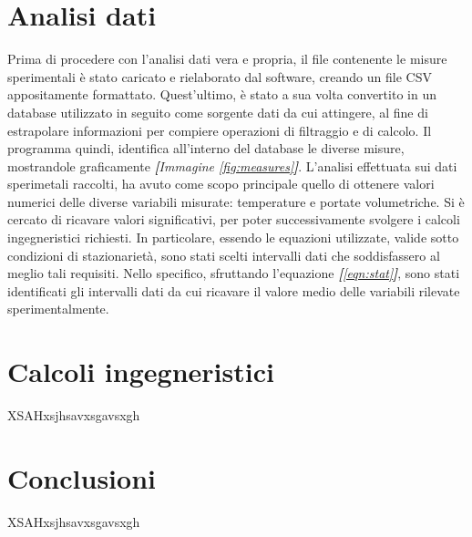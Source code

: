 \documentclass[a4paper,10pt]{article}                                                                                       %
\begin{document}
\section{Analisi dati}                                                                                                      %
\label{sec:data_analysis}                                                                                                   %
  Prima di procedere con l'analisi dati vera e propria, il file contenente le misure sperimentali è stato caricato e
  rielaborato dal software, creando un file CSV appositamente formattato. Quest'ultimo, è stato a sua volta convertito in
  un database utilizzato in seguito come sorgente dati da cui attingere, al fine di estrapolare informazioni per compiere
  operazioni di filtraggio e di calcolo. Il programma quindi, identifica all'interno del database le diverse misure,
  mostrandole graficamente \textit{\textbf{[}Immagine \ref{fig:measures}\textbf{]}}.
  L'analisi effettuata sui dati sperimetali raccolti, ha avuto come scopo principale quello di ottenere valori numerici
  delle diverse variabili misurate: temperature e portate volumetriche. Si è cercato di ricavare valori significativi, per
  poter successivamente svolgere i calcoli ingegneristici richiesti. In particolare, essendo le equazioni utilizzate,
  valide sotto condizioni di stazionarietà, sono stati scelti intervalli dati che soddisfassero al meglio tali requisiti.
  Nello specifico, sfruttando l'equazione \textit{\textbf{[}\ref{eqn:stat}\textbf{]}}, sono stati identificati gli
  intervalli dati da cui ricavare il valore medio delle variabili rilevate sperimentalmente. 

\section{Calcoli ingegneristici}                                                                                            %
\label{sec:engineering_calcs}                                                                                               %
  XSAHxsjhsavxsgavsxgh

\section{Conclusioni}                                                                                                       %
\label{sec:conclusions}                                                                                                     %
  XSAHxsjhsavxsgavsxgh
\end{document}
